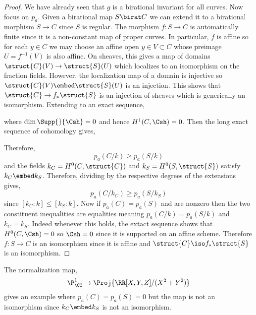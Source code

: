\documentclass[12pt]{article}
\begin{document}
\begin{proof}
We have already seen that $g$ is a birational invariant for all curves. Now focus on $p_a$. Given a birational map $S \birat C$ we can extend it to a birational morphism $S \to C$ since $S$ is regular. The morphism $f : S \to C$ is automatically finite since it is a non-constant map of proper curves. In particular, $f$ is affine so for each $y \in C$ we may choose an affine open $y \in V \subset C$ whose preimage $U = f^{-1}(V)$ is also affine. On sheaves, this gives a map of domains $\struct{C}(V) \to \struct{S}(U)$ which localizes to an isomorphism on the fraction fields. However, the localization map of a domain is injective so $\struct{C}(V) \embed \struct{S}(U)$ is an injection. This shows that $\struct{C} \to f_* \struct{S}$ is an injection of sheaves which is generically an isomorphism. Extending to an exact sequence,
\begin{center}
\end{center} 
where $\dim{\Supp{}{\Csh}} = 0$ and hence $H^1(C, \Csh) = 0$. Then the long exact sequence of cohomology gives,
\begin{center}
\end{center}
Therefore, 
\[ p_a(C/k) \ge p_a(S/k) \]
and the fields $k_C = H^0(C, \struct{C})$ and $k_{S} = H^0(S, \struct{S})$ satisfy $k_C \embed k_{S}$. Therefore, dividing by the respective degrees of the extensions gives,
\[ p_a(C/k_C) \ge p_a(S/k_S) \]
since $[k_C : k] \le [k_S : k]$. Now if $p_a(C) = p_a(S)$ and are nonzero then the two constituent inequalities are equalities meaning $p_a(C/k) = p_a(S/k)$ and $k_C = k_S$. Indeed whenever this holds, the extact sequence shows that $H^0(C, \Csh) = 0$ so $\Csh = 0$ since it is supported on an affine scheme. Therefore $f : S \to C$ is an isomorphism since it is affine and $\struct{C} \iso f_* \struct{S}$ is an isomorphism. 
\end{proof}

\begin{example}
The normalization map,
\[ \P^1_{\CC} \to \Proj{\RR[X,Y,Z]/(X^2 + Y^2)} \]
gives an example where $p_a(C) = p_a(S) = 0$ but the map is not an isomorphism since $k_C \embed k_{S}$ is not an isomorphism. 
\end{example}
\end{document}
